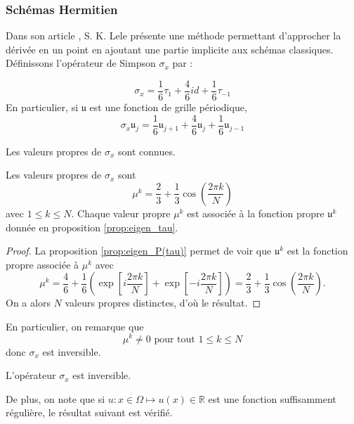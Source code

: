 \subsubsection{Schémas Hermitien}

Dans son article \cite{Lele1991}, S. K. Lele présente une méthode permettant d'approcher la dérivée en un point en ajoutant une partie implicite aux schémas classiques. Définissons l'opérateur de Simpson $\sigma_{x}$ par :

\begin{equation}
\sigma_{x}  = \dfrac{1}{6} \tau_1 + \dfrac{4}{6} id + \dfrac{1}{6}\tau_{-1}
\end{equation}
En particulier, si $\mathfrak{u}$ est une fonction de grille périodique,
\begin{equation}
\sigma_x \mathfrak{u}_j = \dfrac{1}{6} \mathfrak{u}_{j+1} + \dfrac{4}{6} \mathfrak{u}_j + \dfrac{1}{6} \mathfrak{u}_{j-1}
\end{equation}

Les valeurs propres de $\sigma_x$ sont connues.
\begin{proposition}
Les valeurs propres de $\sigma_x$ sont 
\begin{equation}
\mu^k = \dfrac{2}{3} + \dfrac{1}{3} \cos \left( \dfrac{2 \pi k}{N} \right)
\end{equation}
avec $1 \leq k \leq N$. Chaque valeur propre $\mu^k$ est associée à la fonction propre $\mathfrak{u}^k$ donnée en proposition \ref{prop:eigen_tau}.
\label{prop:vp_sigma}
\end{proposition}

\begin{proof}
La proposition \ref{prop:eigen_P(tau)} permet de voir que $\mathfrak{u}^k$ est la fonction propre associée à $\mu^k$ avec 
\begin{equation}
\mu^k = \dfrac{4}{6} + \dfrac{1}{6} \left( \exp \left[ i \dfrac{2 \pi k}{N} \right] + \exp \left[ - i \dfrac{2 \pi k}{N} \right] \right) = \dfrac{2}{3} + \dfrac{1}{3} \cos \left( \dfrac{2 \pi k}{N} \right).
\end{equation}
On a alors $N$ valeurs propres distinctes, d'où le résultat.
\end{proof}
En particulier, on remarque que 
\begin{equation}
\mu^k \neq 0 \text{ pour tout } 1 \leq k \leq N
\end{equation}
donc $\sigma_x$ est inversible.

\begin{corollaire}
L'opérateur $\sigma_x$ est inversible.
\end{corollaire}
De plus, on note que si $u : x \in \Omega \mapsto u(x) \in \mathbb{R}$ est une fonction suffisamment régulière, le résultat suivant est vérifié.

